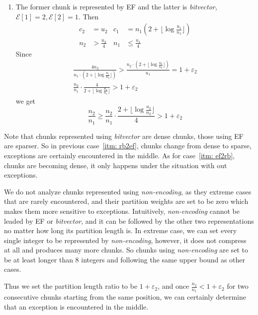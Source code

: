 \documentclass[runningheads,a4paper]{llncs}
\begin{document}
\begin{enumerate}
\item \label{itm: ef2rb}
The former chunk is represented by EF and the latter is \textit{bitvector},$ \mathcal{E}[1]= 2, \mathcal{E}[2]=1 $. Then
\begin{align*}
c_2 & = u_2 & c_1 & = n_1(2+\lfloor \log \frac{u_1}{n_1} \rfloor)\\ 
n_2 & > \frac{u_2}{4} & n_1 & \leq \frac{u_1}{4}
\end{align*}
Since
\begin{gather*}
\frac{4 n_2}{n_1 \cdot (2+\lfloor \log \frac{u_1}{n_2} \rfloor)} > \frac{n_2 \cdot (2+\lfloor \log \frac{u_2}{n_2} \rfloor)}{u_1} = 1 + \varepsilon_2 \\
\frac{n_2}{n_1} \cdot \frac{4}{2+\lfloor \log \frac{u_1}{n_1} \rfloor} > 1 + \varepsilon_2
\end{gather*}
we get
\[
\frac{n_2}{n_1} \geq \frac{n_2}{n_1} \cdot \frac{2+\lfloor \log \frac{u_2}{n_2} \rfloor}{4} > 1 + \varepsilon_2
\]
\end{enumerate}

Note that chunks represented using \textit{bitvector} are dense chunks, those using EF are sparser.
So in previous case~\ref{itm: rb2ef}, chunks change from dense to sparse, exceptions are certainly encountered in the middle.
As for case~\ref{itm: ef2rb}, chunks are becoming dense, it only happens under the situation with out exceptions.

We do not analyze chunks represented using \textit{non-encoding}, as they extreme cases that are rarely encountered, and their partition weights are set to be zero which makes them more sensitive to exceptions.
Intuitively, \textit{non-encoding} cannot be leaded by EF or \textit{bitvector}, and it can be followed by the other two representations no matter how long its partition length is.
In extreme case, we can set every single integer to be represented by \textit{non-encoding}, however, it does not compress at all and produces many more chunks. So chunks using \textit{non-encoding} are set to be at least longer than 8 integers and following the same upper bound as other cases.

Thus we set the partition length ratio to be $ 1+\varepsilon_2 $, and once $ \frac{n_2}{n_1} < 1+ \varepsilon_2 $ for two consecutive chunks starting from the same position, we can certainly determine that an exception is encountered in the middle.  
\end{document}
